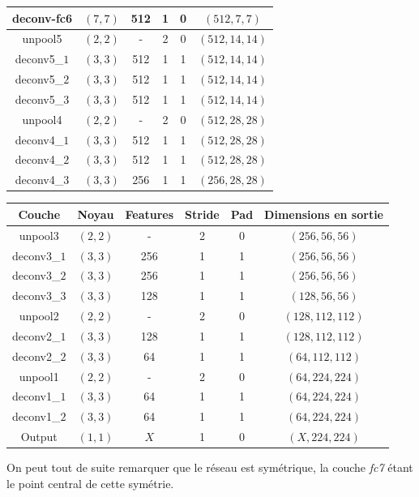 \documentclass[a4paper, 11pt]{report}
\begin{document}
\begin{center}
\begin{tabular}{|c|c|c|c|c|c|}
	deconv-fc6 & $(7, 7)$ & 512 & 1 & 0 & $(512, 7, 7)$ \\
	\hline
	unpool5 & $(2, 2)$ & - & 2 & 0 & $(512, 14, 14)$ \\
	\hline
	deconv5\_$1$ & $(3, 3)$ & 512 & 1 & 1 & $(512, 14, 14)$ \\
	\hline
	deconv5\_$2$ & $(3, 3)$ & 512 & 1 & 1 & $(512, 14, 14)$ \\
	\hline
	deconv5\_$3$ & $(3, 3)$ & 512 & 1 & 1 & $(512, 14, 14)$ \\
	\hline
	unpool4 & $(2, 2)$ & - & 2 & 0 & $(512, 28, 28)$ \\
	\hline
	deconv4\_$1$ & $(3, 3)$ & 512 & 1 & 1 & $(512, 28, 28)$ \\
	\hline
	deconv4\_$2$ & $(3, 3)$ & 512 & 1 & 1 & $(512, 28, 28)$ \\
	\hline
	deconv4\_$3$ & $(3, 3)$ & 256 & 1 & 1 & $(256, 28, 28)$ \\
	\hline
	\end{tabular} 
\end{center}
\begin{center}
	\begin{tabular}{|c|c|c|c|c|c|}
	\hline 
	Couche & Noyau & Features & Stride & Pad & Dimensions en sortie \\ 
	\hline
	unpool3 & $(2, 2)$ & - & 2 & 0 & $(256, 56, 56)$ \\
	\hline
	deconv3\_$1$ & $(3, 3)$ & 256 & 1 & 1 & $(256, 56, 56)$ \\
	\hline
	deconv3\_$2$ & $(3, 3)$ & 256 & 1 & 1 & $(256, 56, 56)$ \\
	\hline
	deconv3\_$3$ & $(3, 3)$ & 128 & 1 & 1 & $(128, 56, 56)$ \\
	\hline
	unpool2 & $(2, 2)$ & - & 2 & 0 & $(128, 112, 112)$ \\
	\hline
	deconv2\_$1$ & $(3, 3)$ & 128 & 1 & 1 & $(128, 112, 112)$ \\
	\hline
	deconv2\_$2$ & $(3, 3)$ & 64 & 1 & 1 & $(64, 112, 112)$ \\
	\hline
	unpool1 & $(2, 2)$ & - & 2 & 0 & $(64, 224, 224)$ \\
	\hline
	deconv1\_$1$ & $(3, 3)$ & 64 & 1 & 1 & $(64, 224, 224)$ \\
	\hline
	deconv1\_$2$ & $(3, 3)$ & 64 & 1 & 1 & $(64, 224, 224)$ \\
	\hline
	Output & $(1, 1)$ & $X$ & 1 & 0 & $(X, 224, 224)$ \\
	\hline
	\end{tabular} 
\end{center}
On peut tout de suite remarquer que le réseau est symétrique, la couche \emph{fc7} étant le point central de cette symétrie.
\end{document}

